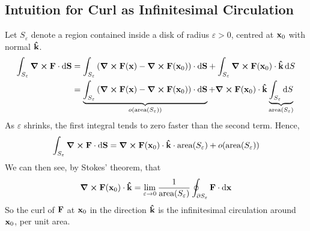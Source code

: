 \subsection{Intuition for Curl as Infinitesimal Circulation}
Let \(S_\varepsilon\) denote a region contained inside a disk of radius \(\varepsilon > 0\), centred at \(\vb x_0\) with normal \(\vu{k}\).
\begin{align*}
	\int_{S_\varepsilon} \curl{\vb F} \cdot \dd{\vb S} & = \int_{S_\varepsilon} \left( \curl{\vb F(\vb x)} - \curl{\vb F(\vb x_0)} \right) \cdot \dd{\vb S} + \int_{S_\varepsilon} \curl{\vb F(\vb x_0)} \cdot \vu k \dd{S}                                                                                        \\
	                                                   & = \underbrace{\int_{S_\varepsilon} \left( \curl{\vb F(\vb x)} - \curl{\vb F(\vb x_0)} \right) \cdot \dd{\vb S}}_{o(\text{area}(S_\varepsilon))} + \curl{\vb F(\vb x_0)} \cdot \vu k \underbrace{\int_{S_\varepsilon} \dd{S}}_{\text{area}(S_\varepsilon)} \\
\end{align*}
As \(\varepsilon\) shrinks, the first integral tends to zero faster than the second term.
Hence,
\[
	\int_{S_\varepsilon} \curl{\vb F} \cdot \dd{\vb S} =  \curl{\vb F(\vb x_0)} \cdot \vu k \cdot \text{area}(S_\varepsilon) + o(\text{area}(S_\varepsilon))
\]
We can then see, by Stokes' theorem, that
\[
	\curl{\vb F(\vb x_0)} \cdot \vu k = \lim_{\varepsilon \to 0} \frac{1}{\text{area}(S_\varepsilon)} \oint_{\partial S_\varepsilon} \vb F \cdot \dd{\vb x}
\]
So the curl of \(\vb F\) at \(\vb x_0\) in the direction \(\vu k\) is the infinitesimal circulation around \(\vb x_0\), per unit area.
